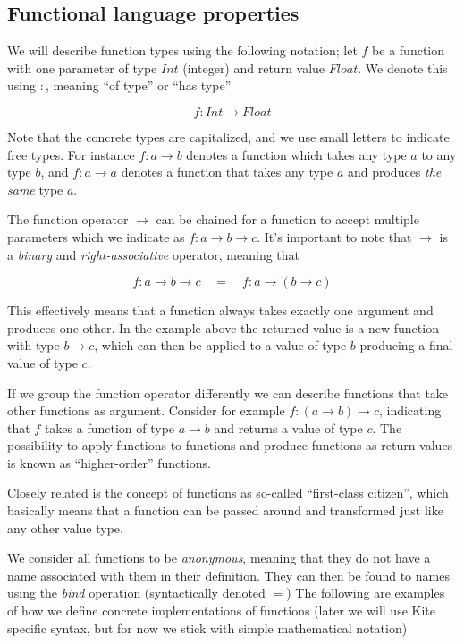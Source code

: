 \subsection{Functional language properties}
We will describe function types using the following notation; let $f$ be a function with one parameter of type $Int$ (integer) and return value $Float$. We denote this using $:$, meaning ``of type'' or ``has type''

\[ f: Int \to Float \]

Note that the concrete types are capitalized, and we use small letters to indicate free types. For instance $f: a \to b$ denotes a function which takes any type $a$ to any type $b$, and $f: a \to a$ denotes a function that takes any type $a$ and produces \emph{the same} type $a$.

The function operator $\to$ can be chained for a function to accept multiple parameters which we indicate as $f: a \to b \to c$. It's important to note that $\to$ is a \emph{binary} and \emph{right-associative} operator, meaning that

\[ f: a \to b \to c \quad = \quad f: a \to (b \to c) \]

This effectively means that a function always takes exactly one argument and produces one other. In the example above the returned value is a new function with type $b \to c$, which can then be applied to a value of type $b$ producing a final value of type $c$.

If we group the function operator differently we can describe functions that take other functions as argument. Consider for example $f: (a \to b) \to c$, indicating that $f$ takes a function of type $a \to b$ and returns a value of type $c$. The possibility to apply functions to functions and produce functions as return values is known as ``higher-order'' functions.

Closely related is the concept of functions as so-called ``first-class citizen'', which basically means that a function can be passed around and transformed just like any other value type.

We consider all functions to be \emph{anonymous}, meaning that they do not have a name associated with them in their definition. They can then be found to names using the \emph{bind} operation (syntactically denoted $=$) The following are examples of how we define concrete implementations of functions (later we will use Kite specific syntax, but for now we stick with simple mathematical notation)

